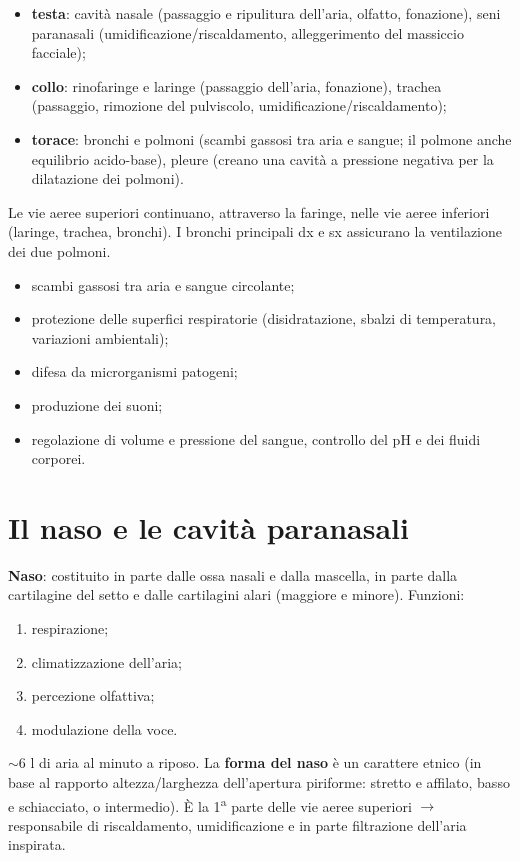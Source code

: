 \begin{itemize}
  \item \textbf{testa}: cavità nasale (passaggio e ripulitura dell'aria, olfatto, fonazione), seni
    paranasali (umidificazione/riscaldamento, alleggerimento del massiccio facciale);
  \item \textbf{collo}: rinofaringe e laringe (passaggio dell'aria, fonazione), trachea (passaggio,
    rimozione del pulviscolo, umidificazione/riscaldamento);
  \item \textbf{torace}: bronchi e polmoni (scambi gassosi tra aria e sangue; il polmone anche
    equilibrio acido-base), pleure (creano una cavità a pressione negativa per la dilatazione dei
    polmoni).
\end{itemize}
Le vie aeree superiori continuano, attraverso la faringe, nelle vie aeree inferiori (laringe,
trachea, bronchi). I bronchi principali dx e sx assicurano la ventilazione dei due polmoni.

\begin{itemize}
  \item scambi gassosi tra aria e sangue circolante;
  \item protezione delle superfici respiratorie (disidratazione, sbalzi di temperatura, variazioni
    ambientali);
  \item difesa da microrganismi patogeni;
  \item produzione dei suoni;
  \item regolazione di volume e pressione del sangue, controllo del pH e dei fluidi corporei.
\end{itemize}

\section{Il naso e le cavità paranasali}

\textbf{Naso}: costituito in parte dalle ossa nasali e dalla mascella, in parte dalla cartilagine
del setto e dalle cartilagini alari (maggiore e minore). Funzioni:
\begin{enumerate}
  \item respirazione;
  \item climatizzazione dell'aria;
  \item percezione olfattiva;
  \item modulazione della voce.
\end{enumerate}
$\sim$6 l di aria al minuto a riposo. La \textbf{forma del naso} è un carattere etnico (in base al
rapporto altezza/larghezza dell'apertura piriforme: stretto e affilato, basso e schiacciato, o
intermedio). È la 1\textsuperscript{a} parte delle vie aeree superiori $\rightarrow$ responsabile di
riscaldamento, umidificazione e in parte filtrazione dell'aria inspirata.

